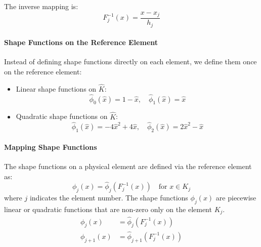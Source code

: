 The inverse mapping is:
\[
  F_j^{-1}(x) = \frac{x - x_j}{h_j}
\]

\paragraph{Shape Functions on the Reference Element}
Instead of defining shape functions directly on each element, we define them once on the reference element:

\begin{itemize}
  \item Linear shape functions on $\hat{K}$:
        \[
          \hat{\phi}_0(\hat{x}) = 1-\hat{x}, \quad \hat{\phi}_1(\hat{x}) = \hat{x}
        \]

  \item Quadratic shape functions on $\hat{K}$:
        \[
          \hat{\phi}_1(\hat{x}) = -4\hat{x}^2 + 4\hat{x}, \quad
          \hat{\phi}_2(\hat{x}) = 2\hat{x}^2 - \hat{x}
        \]
\end{itemize}

\paragraph{Mapping Shape Functions}
The shape functions on a physical element are defined via the reference element as:
\[
  \phi_j(x) = \hat{\phi}_j(F_j^{-1}(x)) \quad \text{for } x \in K_j
\]
where $j$ indicates the element number. The shape functions $\phi_j(x)$ are piecewise linear or quadratic functions that are non-zero only on the element $K_j$.
\begin{align*}
  \phi_j(x)     & = \hat{\phi}_j(F_j^{-1}(x))     \\
  \phi_{j+1}(x) & = \hat{\phi}_{j+1}(F_j^{-1}(x))
\end{align*}

